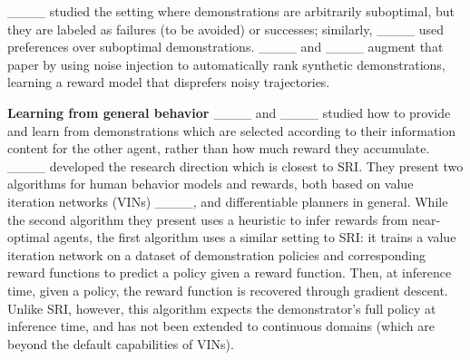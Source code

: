____ studied the setting where demonstrations are arbitrarily suboptimal, but they are labeled as failures (to be avoided) or successes; similarly, ____ used preferences over suboptimal demonstrations. ____ and ____ augment that paper by using noise injection to automatically rank synthetic demonstrations, learning a reward model that disprefers noisy trajectories.



\textbf{Learning from general behavior} ____ and ____
studied how to provide and learn from demonstrations which are selected according to their information content for the other agent, rather than how much reward they accumulate. ____ developed the research direction which is closest to SRI. They present two algorithms for human behavior models and rewards, both based on value iteration networks (VINs) ____, and differentiable planners in general. While the second algorithm they present uses a heuristic to infer rewards from near-optimal agents, the first algorithm uses a similar setting to SRI: it trains a value iteration network on a dataset of demonstration policies and corresponding reward functions to predict a policy given a reward function. Then, at inference time, given a policy, the reward function is recovered through gradient descent. Unlike SRI, however, this algorithm expects the demonstrator's full policy at inference time, and has not been extended to continuous domains (which are beyond the default capabilities of VINs).